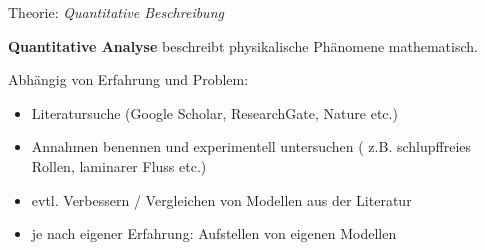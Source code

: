 \documentclass[9pt]{beamer}
\begin{document}
\begin{frame}{Theorie: \emph{Quantitative Beschreibung}}
\begin{center}
{\large \textbf{Quantitative Analyse} beschreibt physikalische Phänomene mathematisch.}
\end{center}

\vfill
Abhängig von Erfahrung und Problem:
\begin{itemize}
\item Literatursuche (Google Scholar, ResearchGate, Nature etc.)
\item Annahmen benennen und experimentell untersuchen ( z.B. schlupffreies Rollen, laminarer Fluss etc.)
\item evtl. Verbessern / Vergleichen von Modellen aus der Literatur
\item je nach eigener Erfahrung: Aufstellen von eigenen Modellen

\end{itemize}
\end{frame}
\end{document}
